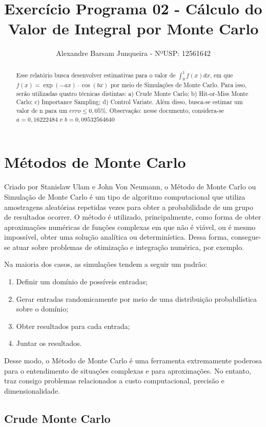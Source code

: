 \documentclass{article}
\title{Exercício Programa 02 - Cálculo do Valor de Integral por Monte Carlo}
\author{Alexandre Barsam Junqueira - NºUSP: 12561642}
\begin{document}
\maketitle

\begin{abstract}
Esse relatório busca desenvolver estimativas para o valor de $\int_0^1 f(x) dx$, em que $f(x) = \exp(-ax)\cdot \cos(bx)$ por meio de Simulações de Monte Carlo. Para isso, serão utilizadas quatro técnicas distintas: a) Crude Monte Carlo; b) Hit-or-Miss Monte Carlo; c) Importance Sampling; d) Control Variate. Além disso, busca-se estimar um valor de n para um $erro \leq 0,05\%$.
Observação: nesse documento, considera-se $a=0,16222484$ e $b=0,09532564640$
\end{abstract}

\section{Métodos de Monte Carlo}

Criado por Stanislaw Ulam e John Von Neumann, o Método de Monte Carlo ou Simulação de Monte Carlo é um tipo de algoritmo computacional que utiliza amostragens aleatórias repetidas vezes para obter a probabilidade de um grupo de resultados ocorrer. O método é utilizado, principalmente, como forma de obter aproximações numéricas de funções complexas em que não é viável, ou é mesmo impossível, obter uma solução analítica ou determinística. Dessa forma, consegue-se atuar sobre problemas de otimização e integração numérica, por exemplo.

Na maioria dos casos, as simulações tendem a seguir um padrão:

\begin{enumerate}
    \item Definir um domínio de possíveis entradas;
    \item Gerar entradas randomicamente por meio de uma distribuição probabilística sobre o domínio;
    \item Obter resultados para cada entrada;
    \item Juntar os resultados.
\end{enumerate}

Desse modo, o Método de Monte Carlo é uma ferramenta extremamente poderosa para o entendimento de situações complexas e para aproximações. No entanto, traz consigo problemas relacionados a custo computacional, precisão e dimensionalidade.

\subsection{Crude Monte Carlo}
\end{document}
